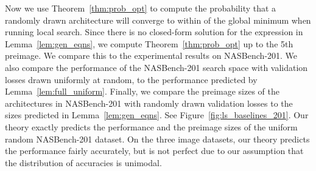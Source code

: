 Now we use Theorem~\ref{thm:prob_opt} to compute the 
probability that a randomly drawn architecture will converge to within 
of the global minimum when running local search.
Since there is no closed-form solution for the expression in Lemma~\ref{lem:gen_eqns},
we compute Theorem~\ref{thm:prob_opt} up to the 5th preimage.
We compare this to the experimental results on NASBench-201.
We also compare the performance of the NASBench-201 search space with validation losses drawn uniformly at random, 
to the performance predicted by Lemma~\ref{lem:full_uniform}.
Finally, we compare the preimage sizes of the architectures in NASBench-201 with
randomly drawn validation losses to the sizes predicted in Lemma~\ref{lem:gen_eqns}.
See Figure~\ref{fig:ls_baselines_201}.
Our theory exactly predicts the performance and the preimage sizes of the uniform 
random NASBench-201 dataset.
On the three image datasets, our theory predicts the performance
fairly accurately, but is not perfect due to our assumption that the distribution
of accuracies is unimodal.

